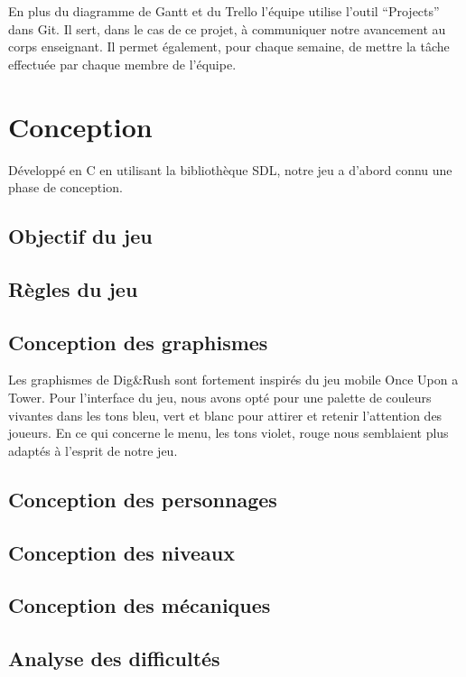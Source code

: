\documentclass[a4paper,12pt]{article}
\begin{document}
En plus du diagramme de Gantt et du Trello l’équipe utilise l’outil “Projects” dans Git. Il sert, dans le cas de ce projet, à communiquer notre avancement au corps enseignant. Il permet également, pour chaque semaine, de mettre la tâche effectuée par chaque membre de l’équipe.



\section{Conception}

Développé en C en utilisant la bibliothèque SDL, notre jeu a d'abord connu une phase de conception.

\subsection{Objectif du jeu}
\subsection{Règles du jeu}
\subsection{Conception des graphismes}
Les graphismes de Dig&Rush sont fortement inspirés du jeu mobile Once Upon a Tower.
Pour l'interface du jeu, nous avons opté pour une palette de couleurs vivantes dans les tons bleu, vert et blanc pour attirer et retenir l'attention des joueurs.
En ce qui concerne le menu, les tons violet, rouge nous semblaient plus adaptés à l'esprit de notre jeu.\\
\subsection{Conception des personnages}
\subsection{Conception des niveaux}
\subsection{Conception des mécaniques}
\subsection{Analyse des difficultés}
\end{document}

